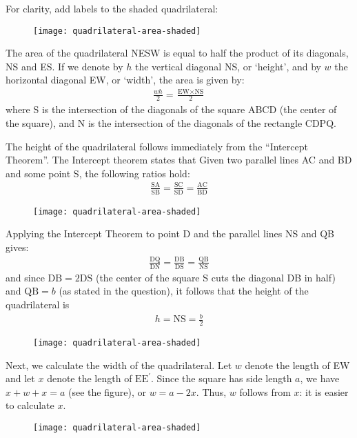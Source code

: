 For clarity, add labels to the shaded quadrilateral: 
\begin{figure}[H]
\centering
\texttt{[image: quadrilateral-area-shaded]}
\end{figure}
The area of the quadrilateral NESW is equal to half the product of its diagonals, NS and ES. If we denote by $h$ the vertical diagonal NS, or `height', and by $w$ the horizontal diagonal EW, or `width', the area is given by:
\begin{align*}
\frac{wh}{2}
 = 
\frac{\text{EW} \times \text{NS}}{2}
\end{align*}
where S is the intersection of the diagonals of the square ABCD (the center of the square), and N is the intersection of the diagonals of the rectangle CDPQ.

The height of the quadrilateral follows immediately from the ``Intercept Theorem''. The Intercept theorem states that Given two parallel lines AC and BD and some point S, the following ratios hold:
\begin{align*}
\frac{\text{SA}}{\text{SB}} 
  = \frac{\text{SC}}{\text{SD}} 
  = \frac{\text{AC}}{\text{BD}} 
\end{align*} 
\begin{figure}[H]
\centering
\texttt{[image: quadrilateral-area-shaded]}
\end{figure}

Applying the Intercept Theorem to point D and the parallel lines NS and QB gives:
\begin{align*}
\frac{\text{DQ}}{\text{DN}} 
  = \frac{\text{DB}}{\text{DS}} 
  = \frac{\text{QB}}{\text{NS}} 
\end{align*}
and since $\text{DB}=2\text{DS}$ (the center of the square S cuts the diagonal DB in half) and $\text{QB}=b$ (as stated in the question), it follows that the height of the quadrilateral is
\begin{align*}
h = \text{NS} = \frac{b}{2}
\end{align*}
\begin{figure}[H]
\centering
\texttt{[image: quadrilateral-area-shaded]}
\end{figure}
Next, we calculate the width of the quadrilateral. Let $w$ denote the length of EW and let $x$ denote the length of $\text{E}\text{E}^{\prime}$. Since the square has side length $a$, we have $x+w+x=a$ (see the figure), or $w=a-2x$. Thus, $w$ follows from $x$: it is easier to calculate $x$. 
\begin{figure}[H]
\centering
\texttt{[image: quadrilateral-area-shaded]}
\end{figure} 

